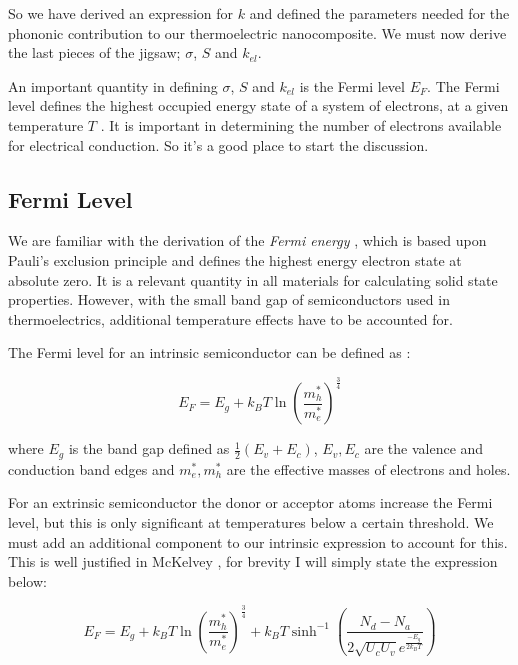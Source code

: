 \documentclass[12pt]{article}
\begin{document}
So we have derived an expression for $k$ and defined the parameters needed for the phononic contribution to our thermoelectric nanocomposite. We must now derive the last pieces of the jigsaw; $\sigma$, $S$ and $k_{el}$.

An important quantity in defining $\sigma$, $S$ and $k_{el}$ is the Fermi level $E_F$. The Fermi level defines the highest occupied energy state of a system of electrons, at a given temperature $T$ \cite{kittel}. It is important in determining the number of electrons available for electrical conduction. So it's a good place to start the discussion.

\subsection{Fermi Level}
We are familiar with the derivation of the \emph{Fermi energy} \cite{kittel}, which is based upon Pauli's exclusion principle and defines the highest energy electron state at absolute zero. It is a relevant quantity in all materials for calculating solid state properties. However, with the small band gap of semiconductors used in thermoelectrics, additional temperature effects have to be accounted for.

The Fermi level for an intrinsic semiconductor can be defined as \cite{mckelvey}:

\begin{equation}
\label{eq:intrinsic-fermi}
	E_F = E_g + k_B T\ln\left(\frac{m^*_h}{m^*_e}\right)^\frac{3}{4}
\end{equation}

where $E_g$ is the band gap defined as $\frac{1}{2} (E_v + E_c)$, $E_v, E_c$ are the valence and conduction band edges and $m^*_e, m^*_h$ are the effective masses of electrons and holes.

For an extrinsic semiconductor the donor or acceptor atoms increase the Fermi level, but this is only significant at temperatures below a certain threshold. We must add an additional component to our intrinsic expression to account for this. This is well justified in McKelvey \cite{mckelvey}, for brevity I will simply state the expression below:

\begin{equation}
\label{eq:extrinsic-fermi}
	E_F = E_g + k_B T\ln\left(\frac{m^*_h}{m^*_e}\right)^\frac{3}{4} + k_BT\sinh^{-1} \left(\frac{N_d-N_a}{2\sqrt{U_cU_v}e^{\frac{-E_g}{2k_BT}}}\right)
\end{equation}
\end{document}
